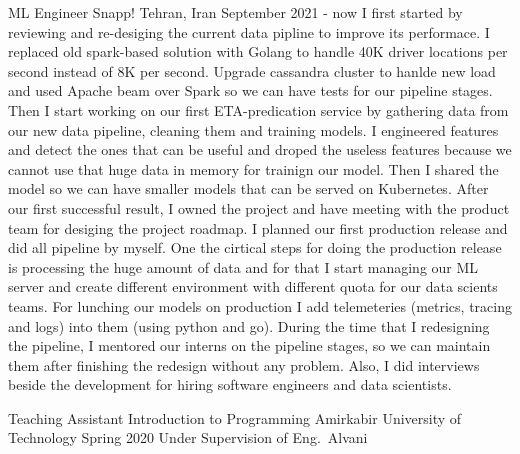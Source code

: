 \begin{cventries}
  \cventry
    {ML Engineer} %
    {Snapp!} %
    {Tehran, Iran} %
    {September 2021 - now} %
    {
      I first started by reviewing and re-desiging the current data pipline to improve its performace.
      I replaced old spark-based solution with Golang to handle 40K driver locations per second instead of
      8K per second. Upgrade cassandra cluster to hanlde new load and used Apache beam over Spark so we can
      have tests for our pipeline stages. Then I start working on our first ETA-predication service by gathering data
      from our new data pipeline, cleaning them and training models. I engineered features and detect the ones that can
      be useful and droped the useless features because we cannot use that huge data in memory for trainign our model.
      Then I shared the model so we can have smaller models that can be served on Kubernetes.
      After our first successful result, I owned the project and have meeting with the product team for desiging
      the project roadmap. I planned our first production release and did all pipeline by myself.
      One the cirtical steps for doing the production release is processing the huge amount of data and for that I
      start managing our ML server and create different environment with different quota for our data scients teams.
      For lunching our models on production I add telemeteries (metrics, tracing and logs) into them (using python and go).
      During the time that I redesigning the pipeline, I mentored our interns on the pipeline stages, so we can maintain
      them after finishing the redesign without any problem.
      Also, I did interviews beside the development for hiring software engineers and data scientists.
    }

\end{cventries}


\begin{cventries}

  \cventry
    {Teaching Assistant} %
    {Introduction to Programming} %
    {Amirkabir University of Technology} %
    {Spring 2020} %
    {Under Supervision of Eng.~Alvani}


\end{cventries}
